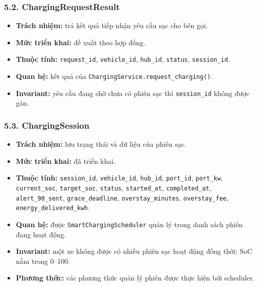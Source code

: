 \documentclass[11pt,a4paper]{article}
\providecommand{\tightlist}{%
  \setlength{\itemsep}{0pt}\setlength{\parskip}{0pt}}
\begin{document}
\hypertarget{chargingrequestresult}{%
\subsubsection{5.2. ChargingRequestResult}\label{chargingrequestresult}}

\begin{itemize}
\tightlist
\item
  \textbf{Trách nhiệm:} trả kết quả tiếp nhận yêu cầu sạc cho bên gọi.
\item
  \textbf{Mức triển khai:} đề xuất theo hợp đồng.
\item
  \textbf{Thuộc tính:} \texttt{request\_id}, \texttt{vehicle\_id},
  \texttt{hub\_id}, \texttt{status}, \texttt{session\_id}.
\item
  \textbf{Quan hệ:} kết quả của
  \texttt{ChargingService.request\_charging()}.
\item
  \textbf{Invariant:} yêu cầu đang chờ chưa có phiên sạc thì
  \texttt{session\_id} không được gán.
\end{itemize}

\hypertarget{chargingsession}{%
\subsubsection{5.3. ChargingSession}\label{chargingsession}}

\begin{itemize}
\tightlist
\item
  \textbf{Trách nhiệm:} lưu trạng thái và dữ liệu của phiên sạc.
\item
  \textbf{Mức triển khai:} đã triển khai.
\item
  \textbf{Thuộc tính:} \texttt{session\_id}, \texttt{vehicle\_id},
  \texttt{hub\_id}, \texttt{port\_id}, \texttt{port\_kw},
  \texttt{current\_soc}, \texttt{target\_soc}, \texttt{status},
  \texttt{started\_at}, \texttt{completed\_at},
  \texttt{alert\_90\_sent}, \texttt{grace\_deadline},
  \texttt{overstay\_minutes}, \texttt{overstay\_fee},
  \texttt{energy\_delivered\_kwh}.
\item
  \textbf{Quan hệ:} được \texttt{SmartChargingScheduler} quản lý trong
  danh sách phiên đang hoạt động.
\item
  \textbf{Invariant:} một xe không được có nhiều phiên sạc hoạt động
  đồng thời; SoC nằm trong 0--100.
\item
  \textbf{Phương thức:} các phương thức quản lý phiên được thực hiện bởi
  scheduler.
\end{itemize}
\end{document}
